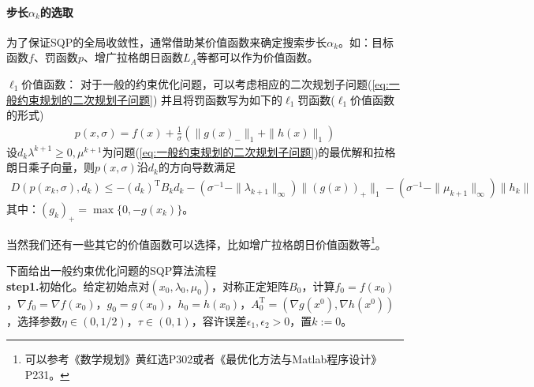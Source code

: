             \paragraph{步长${\alpha}_k$的选取}
            为了保证SQP的全局收敛性，通常借助某价值函数来确定搜索步长${\alpha}_k$。如：目标函数$f$、罚函数$p$、增广拉格朗日函数$L_A$等都可以作为价值函数。
            \par
            $\ell_1$价值函数：
            对于一般的约束优化问题，可以考虑相应的二次规划子问题(\ref{eq:一般约束规划的二次规划子问题})
            并且将罚函数写为如下的$\ell_1$罚函数($\ell_1$价值函数的形式)
            \begin{align}
            \label{eq:价值函数的形式}
            p(x,\sigma) = f(x)+ \frac {1}{\sigma} \left( \|{g(x)}_{-}\|_1+\|h(x)\|_1 \right)
            \end{align}
            设$d_k {\lambda}^{k+1} \geqslant 0,{\mu}^{k+1}$为问题(\ref{eq:一般约束规划的二次规划子问题})的最优解和拉格朗日乘子向量，则$p(x,\sigma)$沿$d_k$的方向导数满足
            \begin{align*}
            D(p(x_k,\sigma),d_k) \leqslant -(d_k)^\mathrm{T} B_kd_k-({\sigma}^{-1}-\|{\lambda}_{k+1}\|_{\infty})\|(g(x))_{+}\|_1-({\sigma}^{-1}-\|{\mu}_{k+1}\|_{\infty})\|h_k\|
            \end{align*}
            其中：$(g_k)_{+}=\max \{0,-g(x_k)\}$。
            \par
            当然我们还有一些其它的价值函数可以选择，比如增广拉格朗日价值函数等\footnote{可以参考《数学规划》黄红选P302或者《最优化方法与Matlab程序设计》P231。}。
            \par
            下面给出一般约束优化问题的SQP算法流程\\
            \textbf{step1.}初始化。给定初始点对$(x_0,\lambda_0,\mu_0)$，对称正定矩阵$B_0$，计算$f_0 = f(x_0)$，$\nabla f_0 = \nabla f(x_0)$，$g_0 = g(x_0)$，$h_0 = h(x_0)$，$A_0^\mathrm{T} = (\nabla g(x^0),\nabla h(x^0))$，选择参数$\eta \in (0,1/2)$，$\tau \in (0,1)$，容许误差$\epsilon_1,\epsilon_2>0$，置$k:=0$。\\

